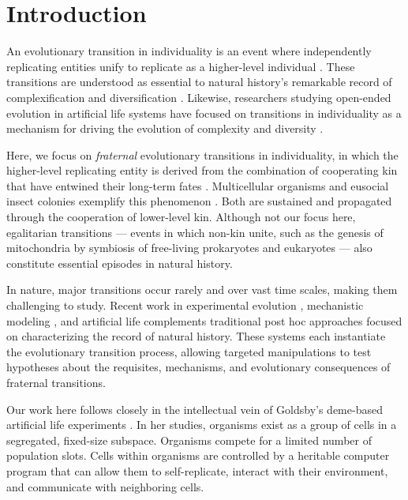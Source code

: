 \section{Introduction}

An evolutionary transition in individuality is an event where independently replicating entities unify to replicate as a higher-level individual \citep{smith1997major}.
These transitions are understood as essential to natural history's remarkable record of complexification and diversification \citep{smith1997major}.
Likewise, researchers studying open-ended evolution in artificial life systems have focused on transitions in individuality as a mechanism for driving the evolution of complexity and diversity \citep{taylor2016open, banzhaf2016defining}.

Here, we focus on \textit{fraternal} evolutionary transitions in individuality, in which the higher-level replicating entity is derived from the combination of cooperating kin that have entwined their long-term fates \citep{west2015major}.
Multicellular organisms and eusocial insect colonies exemplify this phenomenon \citep{smith1997major}.
Both are sustained and propagated through the cooperation of lower-level kin.
Although not our focus here, egalitarian transitions --- events in which non-kin unite, such as the genesis of mitochondria by symbiosis of free-living prokaryotes and eukaryotes \citep{smith1997major} --- also constitute essential episodes in natural history.

In nature, major transitions occur rarely and over vast time scales, making them challenging to study.
Recent work in experimental evolution \citep{ratcliff2014experimental, ratcliff2015origins, gulli2019evolution, koschwanez2013improved}, mechanistic modeling \citep{hanschen2015evolutionary, staps2019emergence}, and artificial life \citep{goldsby2012task, goldsby2014evolutionary} complements traditional post hoc approaches focused on characterizing the record of natural history.
These systems each instantiate the evolutionary transition process, allowing targeted manipulations to test hypotheses about the requisites, mechanisms, and evolutionary consequences of fraternal transitions.

Our work here follows closely in the intellectual vein of Goldsby's deme-based artificial life experiments \citep{goldsby2012task, goldsby2014evolutionary}.
In her studies, organisms exist as a group of cells in a segregated, fixed-size subspace.
Organisms compete for a limited number of population slots.
Cells within organisms are controlled by a heritable computer program that can allow them to self-replicate, interact with their environment, and communicate with neighboring cells.

